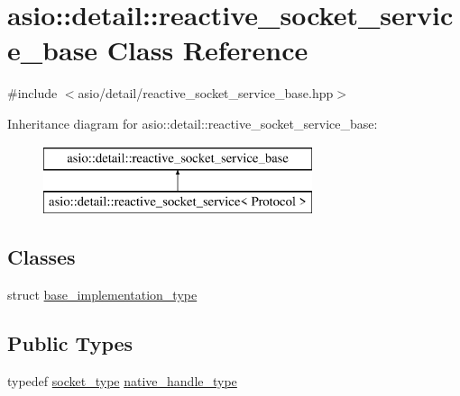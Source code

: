 \hypertarget{classasio_1_1detail_1_1reactive__socket__service__base}{}\section{asio\+:\+:detail\+:\+:reactive\+\_\+socket\+\_\+service\+\_\+base Class Reference}
\label{classasio_1_1detail_1_1reactive__socket__service__base}


{\ttfamily \#include $<$asio/detail/reactive\+\_\+socket\+\_\+service\+\_\+base.\+hpp$>$}

Inheritance diagram for asio\+:\+:detail\+:\+:reactive\+\_\+socket\+\_\+service\+\_\+base\+:\begin{figure}[H]
\begin{center}
\leavevmode
\includegraphics[height=2.000000cm]{classasio_1_1detail_1_1reactive__socket__service__base}
\end{center}
\end{figure}
\subsection*{Classes}
\begin{DoxyCompactItemize}
\item 
struct \hyperlink{structasio_1_1detail_1_1reactive__socket__service__base_1_1base__implementation__type}{base\+\_\+implementation\+\_\+type}
\end{DoxyCompactItemize}
\subsection*{Public Types}
\begin{DoxyCompactItemize}
\item 
typedef \hyperlink{namespaceasio_1_1detail_a6798c771dd84b79798b1a08150706ea9}{socket\+\_\+type} \hyperlink{classasio_1_1detail_1_1reactive__socket__service__base_a7838f400a17a0a3e0fd1c78040f4da53}{native\+\_\+handle\+\_\+type}
\end{DoxyCompactItemize}
